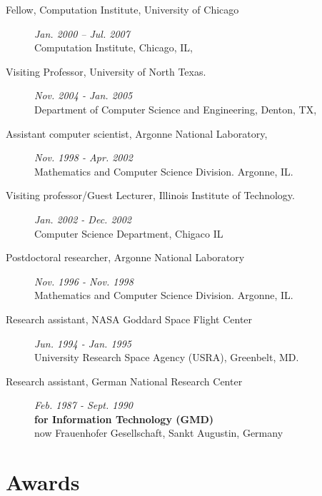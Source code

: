 \documentclass{article}
\begin{document}
\begin{description}
\item[	Fellow, Computation Institute, University of Chicago ] \hfill {\it Jan. 2000 – Jul. 2007} ~\\
  Computation Institute, Chicago, IL, 
  
\item[ 	Visiting Professor, University of North Texas. ] \hfill {\it Nov. 2004 - Jan. 2005} ~\\
  Department of Computer Science and Engineering, Denton, TX,
  
\item[ 	Assistant computer scientist, Argonne National Laboratory, ] \hfill {\it Nov. 1998 - Apr. 2002} ~\\
  Mathematics and Computer Science Division.  Argonne, IL.
    
\item[ 	Visiting professor/Guest Lecturer, Illinois Institute of Technology. ] \hfill {\it Jan. 2002 - Dec. 2002} ~\\
  Computer Science Department, Chigaco IL
  
\item[ 	Postdoctoral researcher,   Argonne National Laboratory ] \hfill {\it Nov. 1996 - Nov. 1998} ~\\
  Mathematics and Computer Science Division.  Argonne, IL.
  
\item[ 	Research assistant, NASA Goddard Space Flight Center] \hfill {\it Jun. 1994 - Jan. 1995} ~\\
  University Research Space Agency (USRA), Greenbelt, MD.

\item[ 	Research assistant, German National Research Center] \hfill {\it Feb. 1987 - Sept. 1990} ~\\
  {\bf  for Information Technology (GMD) } \\
  now Frauenhofer Gesellschaft, Sankt Augustin, Germany
  
\end{description}

\section{Awards}   
\end{document}
